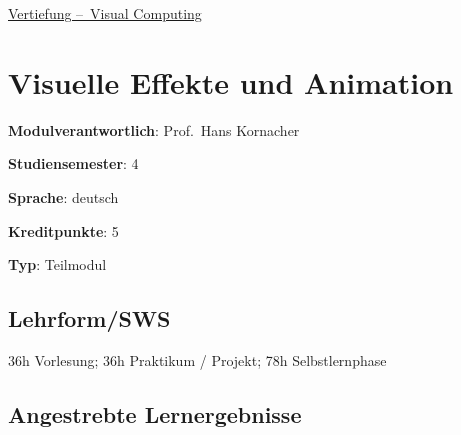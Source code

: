 \hyperref[/mi-2017/modulbeschreibungen-bachelor/BA_Vertiefung-Visual-Computing]{Vertiefung – Visual Computing}

\hypertarget{visuelle-effekte-und-animationpathlabelmi-2017modulbeschreibungen-bachelorba_vc-visuelle-effekte-und-animation}{%
\chapter{Visuelle Effekte und
Animation\label{/mi-2017/modulbeschreibungen-bachelor/BA_VC-visuelle-effekte-und-animation}}\label{visuelle-effekte-und-animationpathlabelmi-2017modulbeschreibungen-bachelorba_vc-visuelle-effekte-und-animation}}

\begin{modulHead}
\textbf{Modulverantwortlich}: Prof.~Hans
Kornacher
\end{modulHead}
\begin{modulHead}
\textbf{Studiensemester}:
4
\end{modulHead}
\begin{modulHead}
\textbf{Sprache}:
deutsch
\end{modulHead}
\begin{modulHead}
\textbf{Kreditpunkte}:
5
\end{modulHead}
\begin{modulHead}
\textbf{Typ}:
Teilmodul
\end{modulHead}


\hypertarget{lehrformswspathlabelmi-2017modulbeschreibungen-bachelorba_vc-visuelle-effekte-und-animation}{%
\section*{Lehrform/SWS\label{/mi-2017/modulbeschreibungen-bachelor/BA_VC-visuelle-effekte-und-animation}}\label{lehrformswspathlabelmi-2017modulbeschreibungen-bachelorba_vc-visuelle-effekte-und-animation}}

36h Vorlesung; 36h Praktikum / Projekt; 78h Selbstlernphase

\hypertarget{angestrebte-lernergebnissepathlabelmi-2017modulbeschreibungen-bachelorba_vc-visuelle-effekte-und-animation}{%
\section*{Angestrebte
Lernergebnisse\label{/mi-2017/modulbeschreibungen-bachelor/BA_VC-visuelle-effekte-und-animation}}\label{angestrebte-lernergebnissepathlabelmi-2017modulbeschreibungen-bachelorba_vc-visuelle-effekte-und-animation}}

